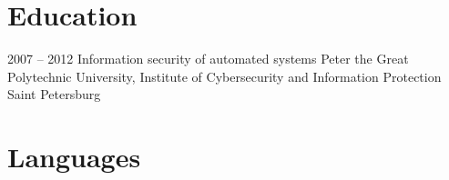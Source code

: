 \documentclass[11pt,a4paper,sans]{moderncv}
\begin{document}
\section{Education}
\cventry
{2007 -- 2012}
{Information security of automated systems}
{\newline{} Peter the Great Polytechnic University, Institute of Cybersecurity and Information Protection}
{Saint Petersburg}
{}
{}

\section{Languages}
\end{document}
